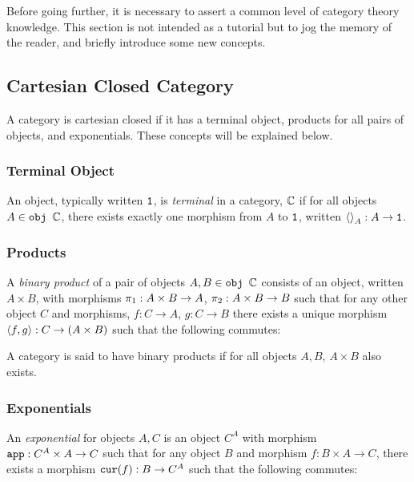 \documentclass{Report}
\begin{document}



Before going further, it is necessary to assert a common level of category theory knowledge. This section is not intended as a tutorial but to jog the memory of the reader, and briefly introduce some new concepts.

\subsection{Cartesian Closed Category}\label{CCC}
A category is cartesian closed if it has a terminal object, products for all pairs of objects, and exponentials. These concepts will be explained below.

\subsubsection{Terminal Object}
An object, typically written $\texttt{1}$, is \textit{terminal} in a category, $\mathbb{C}$ if for all objects $A\in\texttt{obj }\mathbb{C}$, there exists exactly one morphism from $A$ to $\texttt{1}$, written $\left\langle\right\rangle_{A}: A \rightarrow \texttt{1}$.

\subsubsection{Products}
A \textit{binary product} of a pair of objects $A, B\in\texttt{obj }\mathbb{C}$ consists of an object, written $A \times B$, with morphisms $\pi_1: A\times B\rightarrow A$, $\pi_2: A\times B \rightarrow B$ such that for any other object $C$ and morphisms, $f: C\rightarrow A$, $g: C\rightarrow B$ there exists a unique morphism $\left\langle f, g\right\rangle: C \rightarrow (A\times B)$ such that the following commutes:


A category is said to have binary products if for all objects $A, B$, $A\times B$ also exists.

\subsubsection{Exponentials}
An \textit{exponential} for objects $A, C$ is an object $C^A$ with morphism $\texttt{app}: C^A\times A \rightarrow C$ such that for any object $B$ and morphism $f: B\times A \rightarrow C$, there exists a morphism $\texttt{cur}(f): B \rightarrow C^A$ such that the following commutes:
\end{document}
